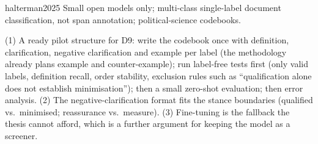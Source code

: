 \begin{papercard}{halterman2025}
 Small open models only; multi-class single-label document classification, not span annotation; political-science codebooks.

 (1) A ready pilot structure for D9: write the codebook once with definition, clarification, negative clarification and example per label (the methodology already plans example and counter-example); run label-free tests first (only valid labels, definition recall, order stability, exclusion rules such as ``qualification alone does not establish minimisation''); then a small zero-shot evaluation; then error analysis. (2) The negative-clarification format fits the stance boundaries (qualified vs.\ minimised; reassurance vs.\ measure). (3) Fine-tuning is the fallback the thesis cannot afford, which is a further argument for keeping the model as a screener.
\end{papercard}
